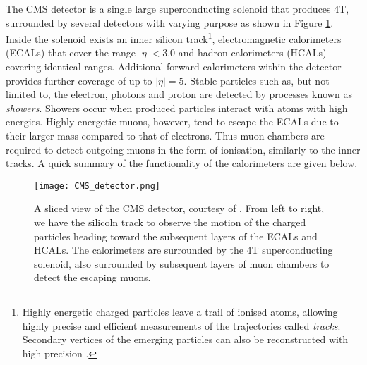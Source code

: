 The CMS detector \cite{chatrchyan2008cms} is a single large superconducting solenoid that produces 4T, surrounded by several detectors with varying purpose as shown in Figure \ref{fig:detector}. Inside the solenoid exists an inner silicon track\footnote{Highly energetic charged particles leave a trail of ionised atoms, allowing highly precise and efficient measurements of the trajectories called \textit{tracks}. Secondary vertices of the emerging particles can also be reconstructed with high precision \cite{chatrchyan2008cms}.}, electromagnetic calorimeters (ECALs) that cover the range $|\eta|<3.0$ and hadron calorimeters (HCALs) covering identical ranges. Additional forward calorimeters within the detector provides further coverage of up to $|\eta|=5$. Stable particles such as, but not limited to, the electron, photons and proton are detected by processes known as \textit{showers}. Showers occur when produced particles interact with atoms with high energies. Highly energetic muons, however, tend to escape the ECALs due to their larger mass compared to that of electrons. Thus muon chambers are required to detect outgoing muons in the form of ionisation, similarly to the inner tracks.  A quick summary of the functionality of the calorimeters are given below. \\

\begin{figure}[htbp]
    \centering
    \texttt{[image: CMS\_detector.png]}
    \caption{A sliced view of the CMS detector, courtesy of \cite{ATLASandCMSDetector}. From left to right, we have the silicoln track to observe the motion of the charged particles heading toward the subsequent layers of the ECALs and HCALs. The calorimeters are surrounded by the 4T superconducting solenoid, also surrounded by subsequent layers of muon chambers to detect the escaping muons.}
    \label{fig:detector}
\end{figure}

